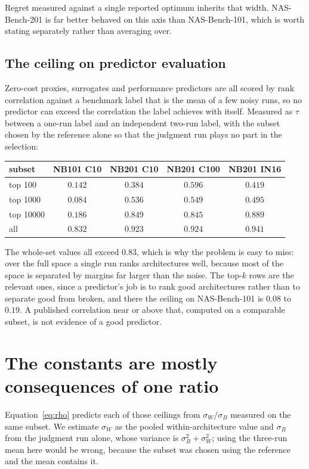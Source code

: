 \documentclass[11pt]{article}
\begin{document}
Regret measured against a single reported optimum inherits that width. NAS-Bench-201 is far better
behaved on this axis than NAS-Bench-101, which is worth stating separately rather than averaging over.

\subsection{The ceiling on predictor evaluation}

Zero-cost proxies, surrogates and performance predictors are all scored by rank correlation against a
benchmark label that is the mean of a few noisy runs, so no predictor can exceed the correlation the
label achieves with itself. Measured as $\tau$ between a one-run label and an independent two-run label,
with the subset chosen by the reference alone so that the judgment run plays no part in the selection:

\begin{center}\small
\begin{tabular}{lcccc}
\toprule
subset & NB101 C10 & NB201 C10 & NB201 C100 & NB201 IN16 \\
\midrule
top 100    & $0.142$ & $0.384$ & $0.596$ & $0.419$ \\
top 1000   & $0.084$ & $0.536$ & $0.549$ & $0.495$ \\
top 10000  & $0.186$ & $0.849$ & $0.845$ & $0.889$ \\
all        & $0.832$ & $0.923$ & $0.924$ & $0.941$ \\
\bottomrule
\end{tabular}
\end{center}

The whole-set values all exceed $0.83$, which is why the problem is easy to miss: over the full space a
single run ranks architectures well, because most of the space is separated by margins far larger than
the noise. The top-$k$ rows are the relevant ones, since a predictor's job is to rank good architectures
rather than to separate good from broken, and there the ceiling on NAS-Bench-101 is $0.08$ to $0.19$. A
published correlation near or above that, computed on a comparable subset, is not evidence of a good
predictor.

\section{The constants are mostly consequences of one ratio}\label{sec:law}

Equation~\eqref{eq:rho} predicts each of those ceilings from $\sigma_W/\sigma_B$ measured on the same
subset. We estimate $\sigma_W$ as the pooled within-architecture value and $\sigma_B$ from the judgment
run alone, whose variance is $\sigma_B^2+\sigma_W^2$; using the three-run mean here would be wrong,
because the subset was chosen using the reference and the mean contains it.
\end{document}
